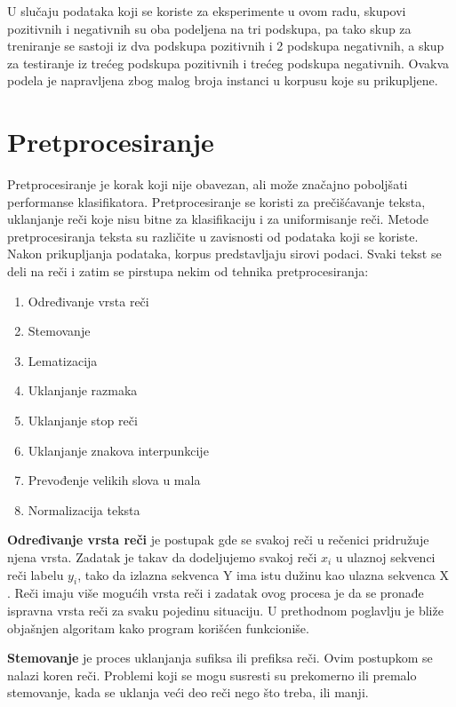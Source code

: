 \documentclass[12pt,oneside]{memoir}
\begin{document}
U slučaju podataka koji se koriste za eksperimente u ovom radu, skupovi pozitivnih i negativnih su oba podeljena na tri podskupa, pa tako skup za treniranje se sastoji iz dva podskupa pozitivnih i 2 podskupa negativnih, a skup za testiranje iz trećeg podskupa pozitivnih i trećeg podskupa negativnih. Ovakva podela je napravljena zbog malog broja instanci u korpusu koje su prikupljene.

\section{Pretprocesiranje}
 
Pretprocesiranje je korak koji nije obavezan, ali može značajno poboljšati performanse klasifikatora. Pretprocesiranje se koristi za prečišćavanje teksta, uklanjanje reči koje nisu bitne za klasifikaciju i za uniformisanje reči. Metode pretprocesiranja teksta su različite u zavisnosti od podataka koji se koriste. Nakon prikupljanja podataka, korpus predstavljaju sirovi podaci. Svaki tekst se deli na reči i zatim se pirstupa nekim od tehnika pretprocesiranja:

\begin{enumerate}
\item Određivanje vrsta reči
\item Stemovanje
\item Lematizacija
\item Uklanjanje razmaka
\item Uklanjanje stop reči
\item Uklanjanje znakova interpunkcije
\item Prevođenje velikih slova u mala
\item Normalizacija teksta
\end{enumerate}

\textbf{Određivanje vrsta reči} je postupak gde se svakoj reči u rečenici pridružuje njena vrsta. Zadatak je takav da dodeljujemo svakoj reči $x_i$ u ulaznoj sekvenci reči labelu $y_i$,  tako da izlazna sekvenca Y ima istu dužinu kao ulazna sekvenca X \cite{postagging}. Reči imaju više mogućih vrsta reči i zadatak ovog procesa je da se pronađe ispravna vrsta reči za svaku pojedinu situaciju. U prethodnom poglavlju je bliže objašnjen algoritam kako program korišćen funkcioniše.

\textbf{Stemovanje} je proces uklanjanja sufiksa ili prefiksa reči. Ovim postupkom se nalazi koren reči. Problemi koji se mogu susresti su prekomerno ili premalo stemovanje, kada se uklanja veći deo reči nego što treba, ili manji.
\end{document}
